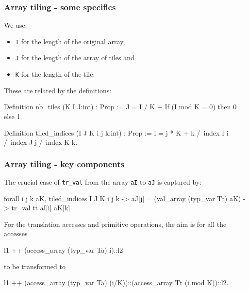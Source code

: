 \begin{frame}[fragile]
\frametitle{Array tiling - some specifics}

We use:
\begin{itemize}
	\item \texttt{I} for the length of the original array,
	\item \texttt{J} for the length of the array of tiles and
	\item \texttt{K} for the length of the tile.
\end{itemize}

\bigskip

These are related by the definitions:

\begin{coq}
Definition nb_tiles (K I J:int) : Prop :=
  J = I / K + If (I mod K = 0) then 0 else 1.

Definition tiled_indices (I J K i j k:int) : Prop :=
		i = j * K + k
	/\	index I i
	/\	index J j
  	/\	index K k.
\end{coq}

\end{frame}


\begin{frame}[fragile]
\frametitle{Array tiling - key components}



The crucial case of \texttt{tr\_val} from the array \texttt{aI} to \texttt{aJ} is captured by: 

\begin{coqs}
  forall i j k aK,		tiled_indices I J K i j k ->
				  aJ[j] = (val_array (typ_var Tt) aK) ->
				  tr_val tt aI[i] aK[k]
\end{coqs}

\bigskip \pause

For the translation accesses and primitive operations, the aim is for all the accesses

\begin{coqs}
  l1 ++ (access_array (typ_var Ta) i)::l2
\end{coqs}

to be transformed to

\begin{coqs}
  l1 ++ (access_array (typ_var Ta) (i/K))::(access_array Tt (i mod K))::l2.
\end{coqs}

\end{frame}



